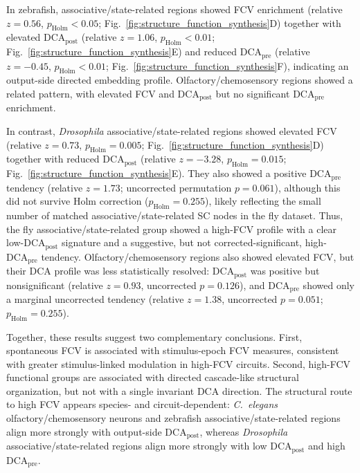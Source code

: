 \documentclass[9pt,twocolumn,twoside]{pnas-new}
\begin{document}
In zebrafish, associative/state-related regions showed FCV enrichment (relative $z=0.56$, $p_{\mathrm{Holm}} <0.05$; Fig.~\ref{fig:structure_function_synthesis}D) together with elevated $\mathrm{DCA}_{\mathrm{post}}$ (relative $z=1.06$, $p_{\mathrm{Holm}} <0.01$; Fig.~\ref{fig:structure_function_synthesis}E) and reduced $\mathrm{DCA}_{\mathrm{pre}}$ (relative $z=-0.45$, $p_{\mathrm{Holm}} < 0.01$; Fig.~\ref{fig:structure_function_synthesis}F), indicating an output-side directed embedding profile. Olfactory/chemosensory regions showed a related pattern, with elevated FCV and $\mathrm{DCA}_{\mathrm{post}}$ but no significant $\mathrm{DCA}_{\mathrm{pre}}$ enrichment.

In contrast, \textit{Drosophila} associative/state-related regions showed elevated FCV (relative $z=0.73$, $p_{\mathrm{Holm}}=0.005$; Fig.~\ref{fig:structure_function_synthesis}D) together with reduced $\mathrm{DCA}_{\mathrm{post}}$ (relative $z=-3.28$, $p_{\mathrm{Holm}}=0.015$; Fig.~\ref{fig:structure_function_synthesis}E). They also showed a positive $\mathrm{DCA}_{\mathrm{pre}}$ tendency (relative $z=1.73$; uncorrected permutation $p=0.061$), although this did not survive Holm correction ($p_{\mathrm{Holm}}=0.255$), likely reflecting the small number of matched associative/state-related SC nodes in the fly dataset. Thus, the fly associative/state-related group showed a high-FCV profile with a clear low-$\mathrm{DCA}_{\mathrm{post}}$ signature and a suggestive, but not corrected-significant, high-$\mathrm{DCA}_{\mathrm{pre}}$ tendency. Olfactory/chemosensory regions also showed elevated FCV, but their DCA profile was less statistically resolved: $\mathrm{DCA}_{\mathrm{post}}$ was positive but nonsignificant (relative $z=0.93$, uncorrected $p=0.126$), and $\mathrm{DCA}_{\mathrm{pre}}$ showed only a marginal uncorrected tendency (relative $z=1.38$, uncorrected $p=0.051$; $p_{\mathrm{Holm}}=0.255$).


Together, these results suggest two complementary conclusions. First, spontaneous FCV is associated with stimulus-epoch FCV measures, consistent with greater stimulus-linked modulation in high-FCV circuits. Second, high-FCV functional groups are associated with directed cascade-like structural organization, but not with a single invariant DCA direction. The structural route to high FCV appears species- and circuit-dependent: \textit{C.~elegans} olfactory/chemosensory neurons and zebrafish associative/state-related regions align more strongly with output-side $\mathrm{DCA}_{\mathrm{post}}$, whereas \textit{Drosophila} associative/state-related regions align more strongly with low $\mathrm{DCA}_{\mathrm{post}}$ and high $\mathrm{DCA}_{\mathrm{pre}}$.
\end{document}
